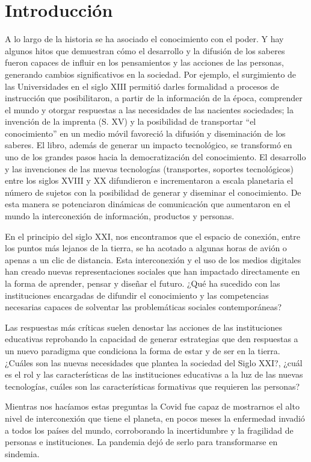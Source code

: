 \documentclass[spanish]{textolivre}
\begin{document}
\section{Introducción}\label{sec-intro}
A lo largo de la historia se ha asociado el conocimiento con el poder. Y hay algunos hitos que demuestran cómo el desarrollo y la difusión de los saberes fueron capaces de influir en los pensamientos y las acciones de las personas, generando cambios significativos en la sociedad. Por ejemplo, el surgimiento de las Universidades en el siglo XIII permitió darles formalidad a procesos de instrucción que posibilitaron, a partir de la información de la época, comprender el mundo y otorgar respuestas a las necesidades de las nacientes sociedades; la invención de la imprenta (S. XV) y la posibilidad de transportar “el conocimiento” en un medio móvil favoreció la difusión y diseminación de los saberes. El libro, además de generar un impacto tecnológico, se transformó en uno de los grandes pasos hacia la democratización del conocimiento. El desarrollo y las invenciones de las nuevas tecnologías (transportes, soportes tecnológicos) entre los siglos XVIII y XX difundieron e incrementaron a escala planetaria el número de sujetos con la posibilidad de generar y diseminar el conocimiento. De esta manera se potenciaron dinámicas de comunicación que aumentaron en el mundo la interconexión de información, productos y personas.

En el principio del siglo XXI, nos encontramos que el espacio de conexión, entre los puntos más lejanos de la tierra, se ha acotado a algunas horas de avión o apenas a un clic de distancia. Esta interconexión y el uso de los medios digitales han creado nuevas representaciones sociales que han impactado directamente en la forma de aprender, pensar y diseñar el futuro. ¿Qué ha sucedido con las instituciones encargadas de difundir el conocimiento y las competencias necesarias capaces de solventar las problemáticas sociales contemporáneas?

Las respuestas más críticas suelen denostar las acciones de las instituciones educativas reprobando la capacidad de generar estrategias que den respuestas a un nuevo paradigma que condiciona la forma de estar y de ser en la tierra. ¿Cuáles son las nuevas necesidades que plantea la sociedad del Siglo XXI?, ¿cuál es el rol y las características de las instituciones educativas a la luz de las nuevas tecnologías, cuáles son las características formativas que requieren las personas?

Mientras nos hacíamos estas preguntas la Covid fue capaz de mostrarnos el alto nivel de interconexión que tiene el planeta, en pocos meses la enfermedad invadió a todos los países del mundo, corroborando la incertidumbre y la fragilidad de personas e instituciones. La pandemia dejó de serlo para transformarse en sindemia.
\end{document}
